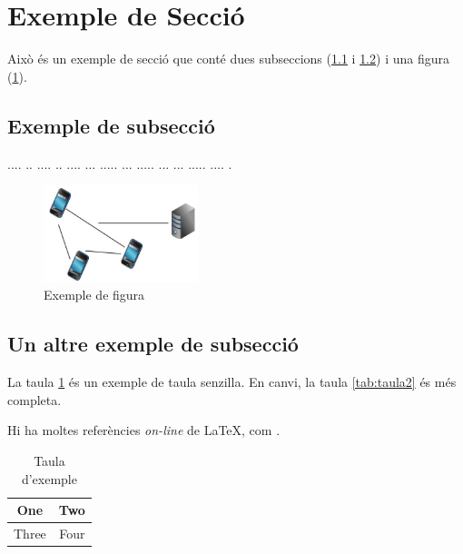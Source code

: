 \documentclass[10pt,a4paper,twocolumn,twoside]{article}
\begin{document}
\section{Exemple de Secció}

Això és un exemple de secció que conté dues subseccions (\ref{subsec-exemple1} i \ref{subsec-exemple2}) i una figura (\ref{fig-exemple}).

\subsection{Exemple de subsecció}
\label{subsec-exemple1}

.... ..  .... .. .... ... ..... ... ..... ... ... ..... .... .


\begin{figure}[!h]
\centering
	\includegraphics[width=0.4\textwidth]{img/adhoc_dtn}
	\caption{Exemple de figura}
	\label{fig-exemple}
\end{figure}

\subsection{Un altre exemple de subsecció}
\label{subsec-exemple2}

La taula \ref{tab:senzilla} és un exemple de taula senzilla. En canvi, la taula \ref{tab:taula2} és més completa.

Hi ha moltes referències \textit{on-line} de \LaTeX, com \cite{latex}.

\begin{table}
\caption{Taula d'exemple}
\label{tab:senzilla}
\begin{center}
\begin{tabular}{|c|c|}
\hline
One & Two\\
\hline
Three & Four\\
\hline
\end{tabular}
\end{center}
\end{table}
\end{document}

